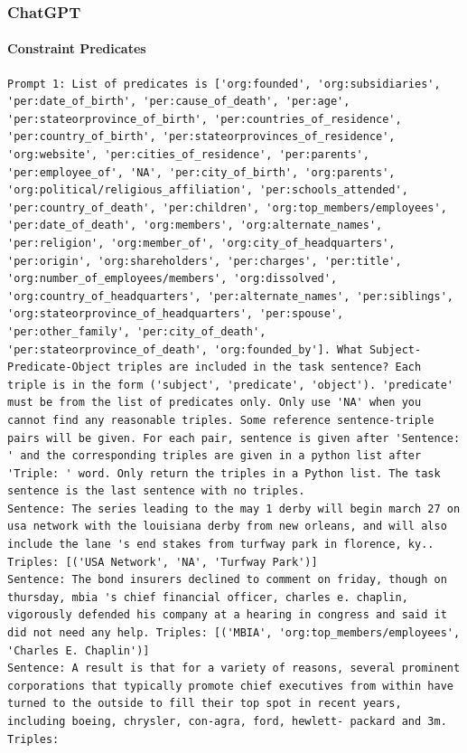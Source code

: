 \documentclass{article}
\begin{document}
\subsubsection{ChatGPT}
\paragraph{Constraint Predicates}
\begin{lstlisting}
Prompt 1: List of predicates is ['org:founded', 'org:subsidiaries', 'per:date_of_birth', 'per:cause_of_death', 'per:age', 'per:stateorprovince_of_birth', 'per:countries_of_residence', 'per:country_of_birth', 'per:stateorprovinces_of_residence', 'org:website', 'per:cities_of_residence', 'per:parents', 'per:employee_of', 'NA', 'per:city_of_birth', 'org:parents', 'org:political/religious_affiliation', 'per:schools_attended', 'per:country_of_death', 'per:children', 'org:top_members/employees', 'per:date_of_death', 'org:members', 'org:alternate_names', 'per:religion', 'org:member_of', 'org:city_of_headquarters', 'per:origin', 'org:shareholders', 'per:charges', 'per:title', 'org:number_of_employees/members', 'org:dissolved', 'org:country_of_headquarters', 'per:alternate_names', 'per:siblings', 'org:stateorprovince_of_headquarters', 'per:spouse', 'per:other_family', 'per:city_of_death', 'per:stateorprovince_of_death', 'org:founded_by']. What Subject-Predicate-Object triples are included in the task sentence? Each triple is in the form ('subject', 'predicate', 'object'). 'predicate' must be from the list of predicates only. Only use 'NA' when you cannot find any reasonable triples. Some reference sentence-triple pairs will be given. For each pair, sentence is given after 'Sentence: ' and the corresponding triples are given in a python list after 'Triple: ' word. Only return the triples in a Python list. The task sentence is the last sentence with no triples.
Sentence: The series leading to the may 1 derby will begin march 27 on usa network with the louisiana derby from new orleans, and will also include the lane 's end stakes from turfway park in florence, ky.. Triples: [('USA Network', 'NA', 'Turfway Park')]
Sentence: The bond insurers declined to comment on friday, though on thursday, mbia 's chief financial officer, charles e. chaplin, vigorously defended his company at a hearing in congress and said it did not need any help. Triples: [('MBIA', 'org:top_members/employees', 'Charles E. Chaplin')]
Sentence: A result is that for a variety of reasons, several prominent corporations that typically promote chief executives from within have turned to the outside to fill their top spot in recent years, including boeing, chrysler, con-agra, ford, hewlett- packard and 3m. Triples:


\end{lstlisting}
\end{document}
